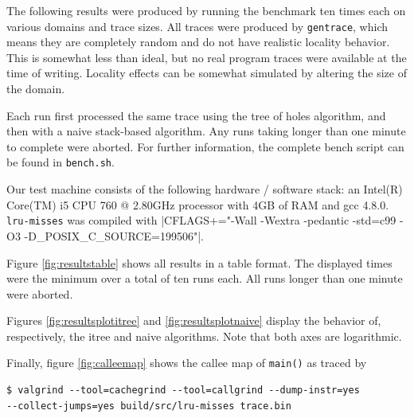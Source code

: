 \documentclass[a4paper,10pt]{article}
\begin{document}
The following results were produced by running the benchmark ten times each
on various domains and trace sizes. All traces were produced by \verb|gentrace|, which means
they are completely random and do not have realistic locality behavior. This is somewhat
less than ideal, but no real program traces were available at the time of writing.
Locality effects can be somewhat simulated by altering the size of the domain.

Each run first processed the same trace using the tree of holes algorithm, and then
with a naive stack-based algorithm.
Any runs taking longer than one minute to complete
were aborted. For further information, the complete bench script can be found in
\verb|bench.sh|.

Our test machine consists of the following hardware / software stack: an Intel(R) Core(TM) i5 CPU 760 @ 2.80GHz
processor with 4GB of RAM and gcc 4.8.0. \verb|lru-misses| was compiled with \spverb|CFLAGS+="-Wall -Wextra -pedantic -std=c99 -O3 -D_POSIX_C_SOURCE=199506"|.

Figure \ref{fig:resultstable} shows all results in a table format. The displayed
times were the minimum over a total of ten runs each. All runs longer than
one minute were aborted.

Figures \ref{fig:resultsplotitree} and \ref{fig:resultsplotnaive} display
the behavior of, respectively, the itree and naive algorithms. Note that both axes
are logarithmic.

Finally, figure \ref{fig:calleemap} shows the callee map of \lstinline|main()|
as traced by

\begin{verbatim}
$ valgrind --tool=cachegrind --tool=callgrind --dump-instr=yes 
--collect-jumps=yes build/src/lru-misses trace.bin 
\end{verbatim}

\end{document}

